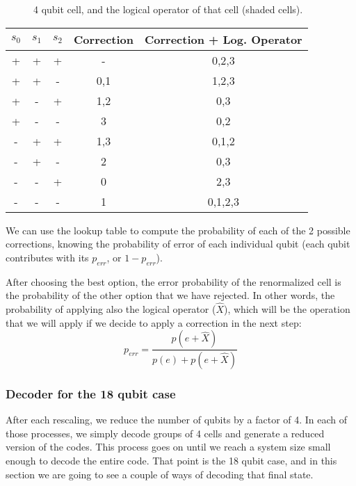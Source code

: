 \documentclass[a4paper,12pt]{article}
\begin{document}
\begin{figure}[ht!]
\begin{center}
\caption{4 qubit cell, and the logical operator of that cell (shaded cells).}

\end{center}
\end{figure}
\begin{table}
\begin{center}
\begin{tabular}{|ccc|c|c|}

\hline
$s_0$&$s_1$	&$s_2$&Correction&Correction + Log. Operator\\
\hline
+	&+	&+	&-	&0,2,3	\\
+	&+	&-	&0,1	&1,2,3	\\
+	&-	&+	&1,2	&0,3		\\
+	&-	&-	&3	&0,2		\\
-	&+	&+	&1,3	&0,1,2	\\
-	&+	&-	&2	&0,3		\\
-	&-	&+	&0	&2,3		\\
-	&-	&-	&1	&0,1,2,3	\\
\hline
\end{tabular}
\end{center}
\end{table}

We can use the lookup table to compute the probability of each of the 2 possible corrections, knowing the probability of error of each individual qubit (each qubit contributes with its $p_{err}$, or $1-p_{err}$).


After choosing the best option, the error probability of the renormalized cell is the probability of  the other option that we have rejected. In other words, the probability of applying also the logical operator ($\hat{X}$), which will be the operation that we will apply if we decide to apply a correction in the next step:
\begin{equation}
p_{err}=\frac{p(e+\hat{X})}{p(e)+p(e+\hat{X})}
\end{equation}

\subsubsection{Decoder for the 18 qubit case}

After each rescaling, we reduce the number of qubits by a factor of 4. In each of those processes, we simply decode groups of 4 cells and generate a reduced version of the codes. This process goes on until we reach a system size small enough to decode the entire code. That point is the 18 qubit case, and in this section we are going to see a couple of ways of decoding that final state.\\
\end{document}
